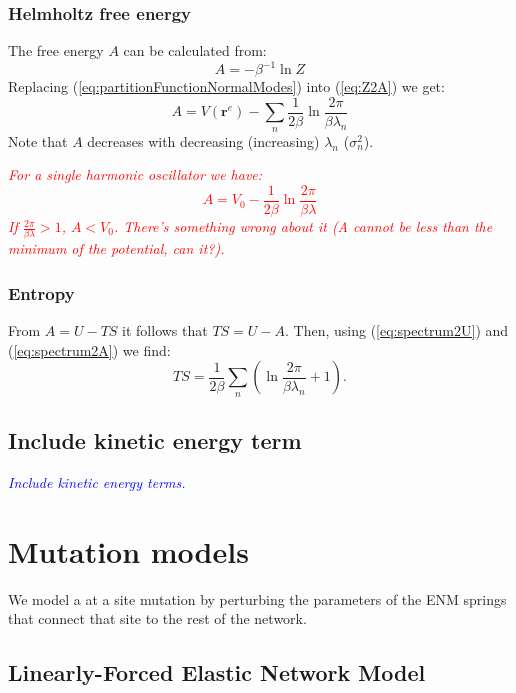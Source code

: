 \documentclass[12pt]{article}
\newcommand{\todo}[1]{\emph{\textcolor{blue} {#1}}}
\newcommand{\comment}[1]{\emph{\textcolor{red} {#1}}}
\newcommand{\rvectorEq}{\mathbf{r}^{e}}
\begin{document}
\subsubsection{Helmholtz free energy}

The free energy $A$ can be calculated from:
\begin{equation} \label{eq:Z2A}
A = - \beta^{-1} \ln Z
\end{equation}
Replacing (\ref{eq:partitionFunctionNormalModes}) into (\ref{eq:Z2A}) we get:
\begin{equation} \label{eq:spectrum2A}
A = V(\rvectorEq) - \sum_{n} \frac{1}{2\beta} \ln \frac{2\pi}{\beta \lambda_n}
\end{equation}
Note that $A$ decreases with decreasing (increasing) $\lambda_n$ ($\sigma_n^2$). 

\comment{
For a single harmonic oscillator we have:
\begin{equation} 
A = V_0 - \frac{1}{2\beta} \ln \frac{2\pi}{\beta \lambda}
\end{equation}
If $\frac{2 \pi}{\beta \lambda} > 1$, $A < V_0$. There's something wrong about it (A cannot be less than the minimum of the potential, can it?). }

\subsubsection{Entropy}
From $A = U - TS$ it follows that $TS = U - A$. Then, using (\ref{eq:spectrum2U}) and (\ref{eq:spectrum2A}) we find:
\begin{equation}
T S = \frac{1}{2\beta}\sum_{n}\left(\ln\frac{2\pi}{\beta \lambda_n} +1 \right).
\end{equation}

\subsection{Include kinetic energy term}
\todo{Include kinetic energy terms.}



\section{Mutation models}

We model a at a site mutation by perturbing the parameters of the ENM springs that connect that site to the rest of the network. 

\subsection{Linearly-Forced Elastic Network Model}
\end{document}
